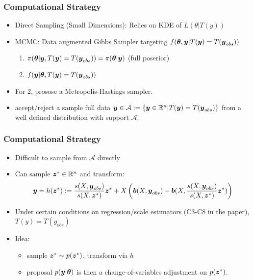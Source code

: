 \documentclass{beamer}
\def\bth{\mbox{\boldmath $\theta$}}
\newcommand{\by}{\mbox{\boldmath $y$}}
\newcommand{\bz}{\mbox{\boldmath $z$}}
\newcommand{\bb}{\mbox{\boldmath $b$}}
\begin{document}
\begin{frame}
\frametitle{Computational Strategy}
\begin{itemize}
	\item Direct Sampling (Small Dimensions): Relies on KDE of $L(\theta | T(y))$ \cite{lewis2014}
	\item MCMC: Data augmented Gibbs Sampler targeting $f(\bth, \by | T(\by)=T(\by_{obs}))$
	\begin{enumerate}
		\item $\pi(\bth|\by, T(\by)=T(\by_{obs})) = \pi(\bth | \by)$ (full poserior)
		\item $f(\by|\bth, T(\by)=T(\by_{obs}))$ 
	\end{enumerate}
\item For 2, prosose a Metropolis-Hastings sampler.
\item accept/reject a sample full data $\by \in \mathcal{A}:=\{\by \in \mathbb{R}^n | T(\by)=T(\by_{obs})\}$ from a well defined distribution with support  $\mathcal{A}$.
\end{itemize}
	
\end{frame}

\begin{frame}
	\frametitle{Computational Strategy}
	\begin{itemize}
		\item Difficult to sample from $ \mathcal{A}$ directly
		\item Can sample $\bz^{*} \in \mathbb{R}^{n}$ and transform:
		$$\by = h(\bz^*) := \frac{s(X,\by_{obs})}{s(X,\bz^*)} \bz^* + X\left(\bb(X,\by_{obs}) - \bb(X,\frac{s(X,\by_{obs})}{s(X,\bz^*)} \bz^*)\right) $$
		\item Under certain conditions on regression/scale estimators (C3-C8 in the paper), $T(y) = T(y_{obs})$
		\item Idea: 
		\begin{itemize}
		\item sample $\bz^{*}\sim p(\bz^*)$, transform via $h$
		\item proposal $p(\by|\bth)$ is then a change-of-variables adjustment on $p(\bz^*)$.
	\end{itemize}
	\end{itemize}	
\end{frame}
\end{document}
